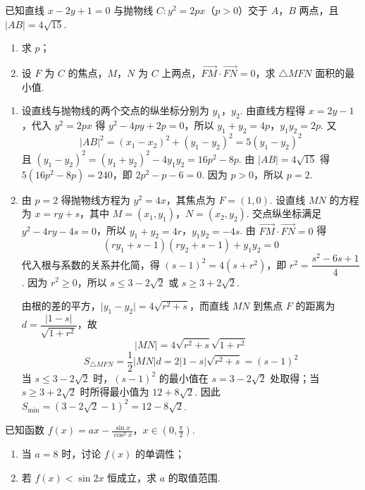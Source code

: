 \begin{problem}
已知直线 \( x-2y+1=0 \) 与抛物线 \( C:y^2=2px \)（\( p>0 \)）交于 \(A\)，\(B\) 两点，且 \( \lvert AB \rvert=4\sqrt{15} \).

\begin{enumerate}
\item 求 \( p \)；
\item 设 \(F\) 为 \(C\) 的焦点，\(M\)，\(N\) 为 \(C\) 上两点，\( \overrightarrow{FM}\cdot\overrightarrow{FN}=0 \)，求 \( \triangle MFN \) 面积的最小值.
\end{enumerate}
\end{problem}

\begin{solution}
\begin{enumerate}
\item 设直线与抛物线的两个交点的纵坐标分别为 \(y_1\)，\(y_2\). 由直线方程得 \(x=2y-1\)，代入 \(y^2=2px\) 得
\(y^2-4py+2p=0\)，所以 \(y_1+y_2=4p\)，\(y_1y_2=2p\). 又
\[
\lvert AB\rvert^2=(x_1-x_2)^2+(y_1-y_2)^2=5(y_1-y_2)^2
\]
且
\((y_1-y_2)^2=(y_1+y_2)^2-4y_1y_2=16p^2-8p\). 由 \(\lvert AB\rvert=4\sqrt{15}\) 得
\(5(16p^2-8p)=240\)，即 \(2p^2-p-6=0\). 因为 \(p>0\)，所以 \(p=2\).
\item 由 \(p=2\) 得抛物线方程为 \(y^2=4x\)，其焦点为 \(F=(1,0)\). 设直线 \(MN\) 的方程为 \(x=ry+s\)，其中 \(M=(x_1,y_1)\)，\(N=(x_2,y_2)\). 交点纵坐标满足
\(y^2-4ry-4s=0\)，所以
\(y_1+y_2=4r\)，\(y_1y_2=-4s\). 由 \(\overrightarrow{FM}\cdot\overrightarrow{FN}=0\) 得
\[
(ry_1+s-1)(ry_2+s-1)+y_1y_2=0
\]
代入根与系数的关系并化简，得
\((s-1)^2=4(s+r^2)\)，即 \(r^2=\dfrac{s^2-6s+1}{4}\). 因为 \(r^2\geq0\)，所以
\(s\leq3-2\sqrt2\) 或 \(s\geq3+2\sqrt2\).

由根的差的平方，\(\lvert y_1-y_2\rvert=4\sqrt{r^2+s}\)，而直线 \(MN\) 到焦点 \(F\) 的距离为
\(d=\dfrac{\lvert1-s\rvert}{\sqrt{1+r^2}}\)，故
\[
\lvert MN\rvert=4\sqrt{r^2+s}\sqrt{1+r^2}
\]
\[
S_{\triangle MFN}=\dfrac12\lvert MN\rvert d
=2\lvert1-s\rvert\sqrt{r^2+s}
=(s-1)^2
\]
当 \(s\leq3-2\sqrt2\) 时，\((s-1)^2\) 的最小值在 \(s=3-2\sqrt2\) 处取得；当 \(s\geq3+2\sqrt2\) 时所得最小值为 \(12+8\sqrt2\). 因此
\(S_{\min}=(3-2\sqrt2-1)^2=12-8\sqrt2\).
\end{enumerate}
\end{solution}

\begin{problem}
已知函数 \( f(x)=ax-\frac{\sin x}{\cos^3x} \)，\( x\in\left( 0,\frac{\pi}{2} \right) \).

\begin{enumerate}
\item 当 \( a=8 \) 时，讨论 \( f(x) \) 的单调性；
\item 若 \( f(x)<\sin2x \) 恒成立，求 \( a \) 的取值范围.
\end{enumerate}
\end{problem}


